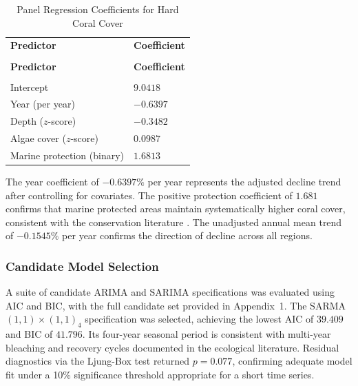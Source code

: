 \documentclass[10pt,letterpaper]{article}
\begin{document}
\begingroup
{}
\renewcommand{\arraystretch}{1.1}
\begin{xltabular}{\textwidth}{>{\centering\arraybackslash}p{6.5cm}
                >{\centering\arraybackslash}X}
\caption{Panel Regression Coefficients for Hard Coral Cover}
\label{tab:panel-regression}\\
\toprule
{}\textbf{Predictor} & \textbf{Coefficient} \\
\midrule
\endfirsthead
{} \\[4pt]
\toprule
{}\textbf{Predictor} & \textbf{Coefficient} \\
\midrule
\endhead
\midrule
{} \\
\endfoot
\bottomrule
\endlastfoot
Intercept                  & $9.0418$ \\
Year (per year)            & $-0.6397$ \\
Depth ($z$-score)          & $-0.3482$ \\
Algae cover ($z$-score)    & $0.0987$ \\
Marine protection (binary) & $1.6813$ \\
\end{xltabular}
\endgroup

The year coefficient of $-0.6397\%$ per year represents the adjusted decline trend after controlling for covariates. The positive protection coefficient of $1.681$ confirms that marine protected areas maintain systematically higher coral cover, consistent with the conservation literature \cite{cesar_beukering_2004}. The unadjusted annual mean trend of $-0.1545\%$ per year confirms the direction of decline across all regions.

\subsubsection{Candidate Model Selection}

A suite of candidate ARIMA and SARIMA specifications was evaluated using AIC and BIC, with the full candidate set provided in Appendix~1. The SARMA$(1,1)\times(1,1)_4$ specification was selected, achieving the lowest AIC of $39.409$ and BIC of $41.796$. Its four-year seasonal period is consistent with multi-year bleaching and recovery cycles documented in the ecological literature. Residual diagnostics via the Ljung-Box test returned $p = 0.077$, confirming adequate model fit under a 10\% significance threshold appropriate for a short time series.
\end{document}
